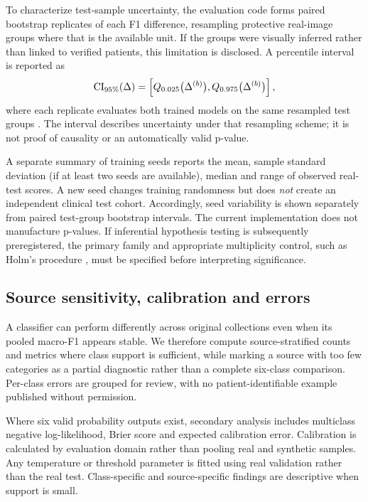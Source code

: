 To characterize test-sample uncertainty, the evaluation code forms paired bootstrap replicates of each F1 difference, resampling protective real-image groups where that is the available unit. If the groups were visually inferred rather than linked to verified patients, this limitation is disclosed. A percentile interval is reported as
\begin{equation}
{\rm CI}_{95\%}(\Delta)=
\left[Q_{0.025}\bigl(\Delta^{(b)}\bigr),
Q_{0.975}\bigl(\Delta^{(b)}\bigr)\right],
\label{eq:bootstrap}
\end{equation}
where each replicate evaluates both trained models on the same resampled test groups \citep{efron1986bootstrap}. The interval describes uncertainty under that resampling scheme; it is not proof of causality or an automatically valid p-value.

A separate summary of training seeds reports the mean, sample standard deviation (if at least two seeds are available), median and range of observed real-test scores. A new seed changes training randomness but does \emph{not} create an independent clinical test cohort. Accordingly, seed variability is shown separately from paired test-group bootstrap intervals. The current implementation does not manufacture p-values. If inferential hypothesis testing is subsequently preregistered, the primary family and appropriate multiplicity control, such as Holm's procedure \citep{holm1979multiple}, must be specified before interpreting significance.

\subsection{Source sensitivity, calibration and errors}
A classifier can perform differently across original collections even when its pooled macro-F1 appears stable. We therefore compute source-stratified counts and metrics where class support is sufficient, while marking a source with too few categories as a partial diagnostic rather than a complete six-class comparison. Per-class errors are grouped for review, with no patient-identifiable example published without permission.

Where six valid probability outputs exist, secondary analysis includes multiclass negative log-likelihood, Brier score and expected calibration error. Calibration is calculated by evaluation domain rather than pooling real and synthetic samples. Any temperature or threshold parameter is fitted using real validation rather than the real test. Class-specific and source-specific findings are descriptive when support is small.

